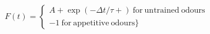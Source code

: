  $F(t) =  \begin{cases} A+ \exp(−\Delta t/τ+)\:\mathrm{for\:untrained\:odours}\\-1\:\mathrm{for\:appetitive\:odours}\} \end{cases}$
 